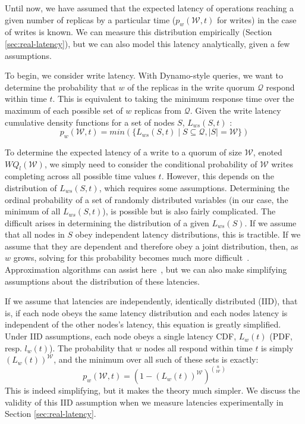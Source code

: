 \documentclass{vldb}
\begin{document}
\label{sec:dynamo-prop}

Until now, we have assumed that the expected latency of operations
reaching a given number of replicas by a particular time
($p_w(\mathcal{W}, t)$ for writes) in the case of writes is known.  We
can measure this distribution empirically (Section
\ref{sec:real-latency}), but we can also model this latency
analytically, given a few assumptions.

To begin, we consider write latency.  With Dynamo-style queries, we
want to determine the probability that $w$ of the replicas in the
write quorum $\mathcal{Q}$ respond within time $t$.  This is
equivalent to taking the minimum response time over the maximum of
each possible set of $w$ replicas from $\mathcal{Q}$.  Given the write
latency cumulative density functions for a set of nodes $S$, $L_{ws}(S, t)$ :
\begin{equation}
p_w(\mathcal{W}, t) = min(\{L_{ws}(S, t) \mid S \subseteq \mathcal{Q}, |S| = \mathcal{W}\})
\end{equation}

To determine the expected latency of a write to a quorum of size
$\mathcal{W}$, enoted $WQ_l(\mathcal{W})$, we simply need to consider
the conditional probability of $\mathcal{W}$ writes completing across
all possible time values $t$.  However, this depends on the
distribution of $L_{ws}(S, t)$, which requires some
assumptions. Determining the ordinal probability of a set of randomly
distributed variables (in our case, the minimum of all $L_{ws}(S,
t)$), is possible but is also fairly complicated.  The difficult
arises in determining the distribution of a given $L_{ws}(S)$.  If we
assume that all nodes in $S$ obey independent latency distributions,
this is tractible.  If we assume that they are dependent and therefore
obey a joint distribution, then, as $w$ grows, solving for this
probability becomes much more difficult~\cite{needed}.  Approximation
algorithms can assist here~\cite{needed}, but we can also make
simplifying assumptions about the distribution of these latencies.

If we assume that latencies are independently, identically distributed
(IID), that is, if each node obeys the same latency distribution and
each nodes latency is independent of the other nodes's latency, this
equation is greatly simplified.  Under IID assumptions, each node
obeys a single latency CDF, $L_w(t)$ (PDF, resp. $l_w(t)$).  The
probability that $w$ nodes all respond within time $t$ is simply
$(L_w(t))^\mathcal{W}$, and the minimum over all such of these sets is
exactly:
\begin{equation}
p_w(\mathcal{W}, t) = (1-(L_w(t))^\mathcal{W})^{n \choose \mathcal{W}}
\end{equation}
This is indeed simplifying, but it makes the theory much simpler.  We
discuss the validity of this IID assumption when we measure latencies
experimentally in Section \ref{sec:real-latency}.
\end{document}
